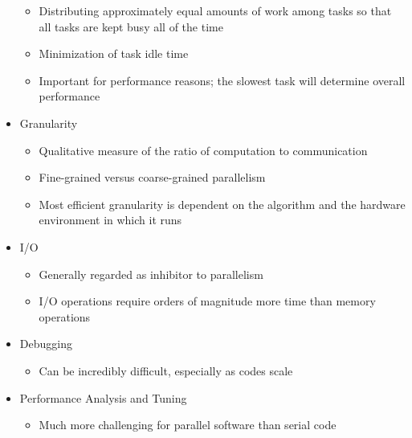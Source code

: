 \documentclass[12pt]{article}
\begin{document}
\begin{itemize}
\begin{itemize}
      \item Distributing approximately equal amounts of work among tasks so
            that all tasks are kept busy all of the time
      \item Minimization of task idle time
      \item Important for performance reasons; the slowest task will determine
            overall performance
      \end{itemize}
\item Granularity
      \begin{itemize}
      \item Qualitative measure of the ratio of computation to communication
      \item Fine-grained versus coarse-grained parallelism
      \item Most efficient granularity is dependent on the algorithm and the
            hardware environment in which it runs
      \end{itemize}
\item I/O
      \begin{itemize}
      \item Generally regarded as inhibitor to parallelism
      \item I/O operations require orders of magnitude more time than memory
            operations
      \end{itemize}
\item Debugging
      \begin{itemize}
      \item Can be incredibly difficult, especially as codes scale
      \end{itemize}
\item Performance Analysis and Tuning
      \begin{itemize}
      \item Much more challenging for parallel software than serial code
      \end{itemize}
\end{itemize}
\end{document}

